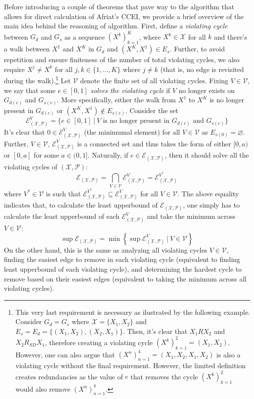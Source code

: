 \documentclass{article} %
\theoremstyle{style1}
\theoremstyle{style1}
\theoremstyle{example}
\begin{document}
Before introducing a couple of theorems that pave way to the algorithm that allows for direct calculation of Afriat's CCEI, we provide a brief overview of the main idea behind the reasoning of algorithm. First, define a \emph{violating cycle} between $G_{d}$ and $G_{s}$ as a sequence $(X^k)_{k=1}^K$, where $X^k\in\mathcal{X}$ for all $k$ and there's a walk between $X^1$ and $X^K$ in $G_d$ and $(X^K,X^1)\in E_s$. Further, to avoid repetition and ensure finiteness of the number of total violating cycles, we also require $X^j\not=X^k$ for all $j,k\in\{1,\ldots,K\}$ where $j\not=k$ (that is, no edge is revisited during the walk).\footnote{This very last requirement is necessary as ilustrated by the following example. Consider $G_d=G_s$ where $\mathcal{X}=\{X_1,X_2\}$ and $E_s=E_d=\{(X_1,X_2),(X_2,X_1)\}$. Then, it's clear that $X_1 R X_2$ and $X_2 R_{SD} X_1$, therefore creating a violating cycle $(X^k)_{k=1}^2=(X_1,X_2)$. However, one can also argue that $(X^n)_{n=1}^4= (X_1,X_2,X_1,X_2)$ is also a violating cycle without the final requirement. However, the limited definition creates redundancies as the value of $e$ that removes the cycle $(X^k)_{k=1}^2$ would also remove $(X^n)_{n=1}^4$.} Let $\mathcal{V}$ denote the finite set of all violating cycles. Fixing $V\in\mathcal{V}$, we say that some $e\in[0,1]$ \emph{solves the violating cycle} if $V$ no longer exists on $G_{d(e)}$ and $G_{s(e)}$. More specifically, either the walk from $X^1$ to $X^K$ is no longer present in $G_{d(e)}$ or $(X^K,X^1)\not\in E_{s(e)}$. Consider the set
$$\mathcal{E}^V_{(\mathcal{X},\mathcal{P})} = \{e\in[0,1]\ |\ V\textrm{ is no longer present in } G_{d(e)}\textrm{ and } G_{s(e)} \}$$
It's clear that $0\in \mathcal{E}^V_{(\mathcal{X},\mathcal{P})}$ (the minimumal element) for all $V\in\mathcal{V}$ as $E_{s(0)}=\varnothing$. Further, $V\in\mathcal{V}$, $\mathcal{E}^V_{(\mathcal{X},\mathcal{P})}$ is a connected set and thus takes the form of either $[0,a)$ or $[0,a]$ for some $a\in(0,1]$. Naturally, if $e\in\mathcal{E}_{(\mathcal{X},\mathcal{P})}$, then it should solve all the violating cycles of $(\mathcal{X},\mathcal{P})$:
$$\mathcal{E}_{(\mathcal{X},\mathcal{P})} = \bigcap_{V\in\mathcal{V}}\mathcal{E}^V_{(\mathcal{X},\mathcal{P})} = \mathcal{E}^{V^*}_{(\mathcal{X},\mathcal{P})}$$
where $V^*\in\mathcal{V}$ is such that $\mathcal{E}^{V^*}_{(\mathcal{X},\mathcal{P})}\subseteq \mathcal{E}^V_{(\mathcal{X},\mathcal{P})}$ for all $V\in\mathcal{V}$. The above equality indicates that, to calculate the least upperbound of $\mathcal{E}_{(\mathcal{X},\mathcal{P})}$, one simply has to calculate the least upperbound of each $\mathcal{E}^V_{(\mathcal{X},\mathcal{P})}$ and take the minimum across $V\in\mathcal{V}$:
$$\sup \mathcal{E}_{(\mathcal{X},\mathcal{P})} = \min\left\{\sup \mathcal{E}^V_{(\mathcal{X},\mathcal{P})}\ |\ V\in\mathcal{V}\right\}$$
On the other hand, this is the same as analyzing all violating cycles $V\in\mathcal{V}$, finding the easiest edge to remove in each violating cycle (equivalent to finding least upperbound of each violating cycle), and determining the hardest cycle to remove based on their easiest edges (equivalent to taking the minimum across all violating cycles). 
\end{document}
